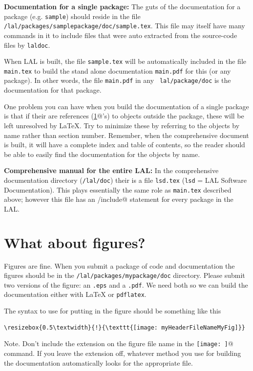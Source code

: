 \documentclass[oneside]{book}
\begin{document}
{\bf Documentation for a single package:}
The guts of the documentation for a package (e.g. {\tt sample}) should reside in the
file {\tt /lal/packages/samplepackage/doc/sample.tex}.
This file may
itself have many \verb@@ commands in it to include files that
were auto extracted from the source-code files by {\tt laldoc}.

When LAL is built, the file  {\tt sample.tex}  will be
automatically included in the file {\tt main.tex} to build the
stand alone documentation  {\tt main.pdf} for this (or any
package). In other words, the file  {\tt main.pdf} in any {\tt
lal/package/doc} is the documentation for that package.

One problem you can have when you build the documentation of a single
package is that if their are references (\verb@\ref{}@'s)  to objects
outside the package, these will be left unresolved by {\LaTeX}.  Try to
minimize these by referring to the objects by name rather than section
number.  Remember, when the comprehensive document is built, it will
have a complete index and table of contents, so the reader should be
able to easily find the documentation for the objects by name.

{\bf Comprehensive manual for the entire LAL:} In the comprehensive
documentation directory ({\tt /lal/doc}) their is a file {\tt lsd.tex}
({\tt lsd} = LAL Software Documentation). This plays essentially the
same role as {\tt main.tex} described above; however this file has an
\verb@/include{}@ statement for every package in the LAL.

\section{What about figures?}

Figures are fine. When you submit a package of code and documentation
the figures should be in the {\tt /lal/packages/mypackage/doc} directory.
Please submit two versions of the figure: an {\tt .eps} and a {\tt .pdf}.
We need both so we can build the documentation either with
{\LaTeX} or {\tt pdflatex}.

The syntax to use for putting in the figure should be something like this
\begin{verbatim}
\resizebox{0.5\textwidth}{!}{\texttt{[image: myHeaderFileNameMyFig]}}
\end{verbatim}
Note. Don't include the extension on the figure file name in
the \verb@\texttt{[image: ]}@ command. If you leave the extension off,
whatever method you use for building the documentation automatically
looks for the appropriate file.
\end{document}
